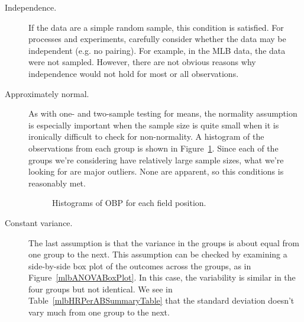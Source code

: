 \begin{description}
\item[Independence.]
    If the data are a simple random sample,
    this condition is satisfied.
    For processes and experiments, carefully consider whether
    the data may be independent (e.g. no pairing).
    For example, in the MLB data, the data were not sampled.
    However, there are not obvious reasons why independence
    would not hold for most or all observations.
\item[Approximately normal.]
    As with one- and two-sample testing for means,
    the normality assumption is especially important
    when the sample size is quite small when it is
    ironically difficult to check for non-normality.
    A histogram of the observations from each group
    is shown in Figure~\ref{mlbANOVADiagNormalityGroups}.
    Since each of the groups we're considering have
    relatively large sample sizes,
    what we're looking for are major outliers.
    None are apparent, so this conditions is reasonably met.

\begin{figure}[h]
  \centering
  \caption{Histograms of OBP for each field position.}
  \label{mlbANOVADiagNormalityGroups}
\end{figure}

\item[Constant variance.]
    The last assumption is that the variance in the
    groups is about equal from one group to the next.
    This assumption can be checked by examining a
    side-by-side box plot of the outcomes across the
    groups, as in Figure~\vref{mlbANOVABoxPlot}.
    In this case, the variability is similar in the
    four groups but not identical.
    We see in Table~\vref{mlbHRPerABSummaryTable}
    that the standard deviation doesn't vary much
    from one group to the next.


\end{description}

